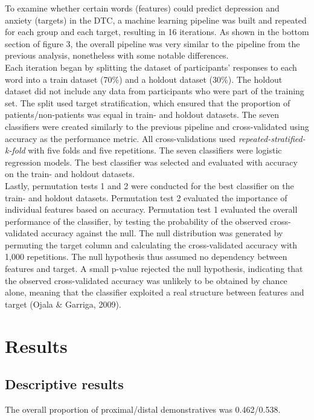 \documentclass[11pt, a4paper]{article}
\begin{document}
To examine whether certain words (features) could predict depression and anxiety (targets) in the DTC, a machine learning pipeline was built and repeated for each group and each target, resulting in 16 iterations. As shown in the bottom section of figure 3, the overall pipeline was very similar to the pipeline from the previous analysis, nonetheless with some notable differences.\\
Each iteration began by splitting the dataset of participants’ responses to each word into a train dataset (70\%) and a holdout dataset (30\%). The holdout dataset did not include any data from participants who were part of the training set. The split used target stratification, which ensured that the proportion of patients/non-patients was equal in train- and holdout datasets. The seven classifiers were created similarly to the previous pipeline and cross-validated using accuracy as the performance metric. All cross-validations used \textit{repeated-stratified-k-fold} with five folds and five repetitions. The seven classifiers were logistic regression models. The best classifier was selected and evaluated with accuracy on the train- and holdout datasets. \\

Lastly, permutation tests 1 and 2 were conducted for the best classifier on the train- and holdout datasets. Permutation test 2 evaluated the importance of individual features based on accuracy. Permutation test 1 evaluated the overall performance of the classifier, by testing the probability of the observed cross-validated accuracy against the null. The null distribution was generated by permuting the target column and calculating the cross-validated accuracy with 1,000 repetitions. The null hypothesis thus assumed no dependency between features and target. A small p-value rejected the null hypothesis, indicating that the observed cross-validated accuracy was unlikely to be obtained by chance alone, meaning that the classifier exploited a real structure between features and target (Ojala \& Garriga, 2009).

\section{Results}
\subsection{Descriptive results}
The overall proportion of proximal/distal demonstratives was 0.462/0.538.
\end{document}
